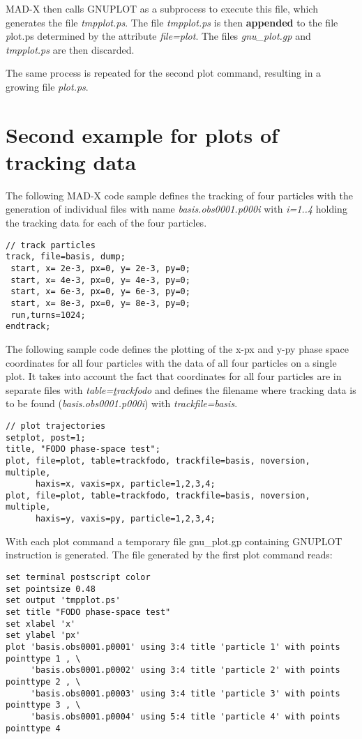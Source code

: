 MAD-X then calls GNUPLOT as a subprocess to execute this file, which
generates the file \textit{tmpplot.ps}.  
The file \textit{tmpplot.ps} is then {\bf appended} to the file 
{\textit plot.ps} determined by the attribute \textit{file=plot}.  
The files \textit{gnu\_plot.gp} and \textit{tmpplot.ps} are then
discarded. 

The same process is repeated for the second plot command, resulting in a
growing file \textit{plot.ps}.


\section{Second example for plots of tracking data}

The following MAD-X code sample defines the tracking of four particles 
with the generation of individual files with name
\textit{basis.obs0001.p000i} with \textit{i=1..4}  
holding the tracking data for each of the four particles.  

\begin{verbatim}
// track particles
track, file=basis, dump;
 start, x= 2e-3, px=0, y= 2e-3, py=0;
 start, x= 4e-3, px=0, y= 4e-3, py=0;
 start, x= 6e-3, px=0, y= 6e-3, py=0;
 start, x= 8e-3, px=0, y= 8e-3, py=0;
 run,turns=1024;
endtrack;
\end{verbatim}

The following sample code defines the plotting of the x-px and y-py
phase space coordinates for all four particles with the data of all four
particles on a single plot.  
It takes into account the fact that coordinates for all four particles
are in separate files with 
\textit{table={\underline track}fodo} and defines the filename where tracking
data is to be found (\textit{basis.obs0001.p000i}) with
\textit{trackfile=basis}.  

\begin{verbatim}
// plot trajectories
setplot, post=1; 
title, "FODO phase-space test";
plot, file=plot, table=trackfodo, trackfile=basis, noversion, multiple, 
      haxis=x, vaxis=px, particle=1,2,3,4; 
plot, file=plot, table=trackfodo, trackfile=basis, noversion, multiple, 
      haxis=y, vaxis=py, particle=1,2,3,4;  
\end{verbatim}

With each plot command a temporary file gnu\_plot.gp containing GNUPLOT instruction is generated. 
The file generated by the first plot command reads: 

{\footnotesize \begin{verbatim}
set terminal postscript color
set pointsize 0.48
set output 'tmpplot.ps'
set title "FODO phase-space test"
set xlabel 'x'
set ylabel 'px'
plot 'basis.obs0001.p0001' using 3:4 title 'particle 1' with points pointtype 1 , \
     'basis.obs0001.p0002' using 3:4 title 'particle 2' with points pointtype 2 , \
     'basis.obs0001.p0003' using 3:4 title 'particle 3' with points pointtype 3 , \
     'basis.obs0001.p0004' using 5:4 title 'particle 4' with points pointtype 4 
\end{verbatim}}

